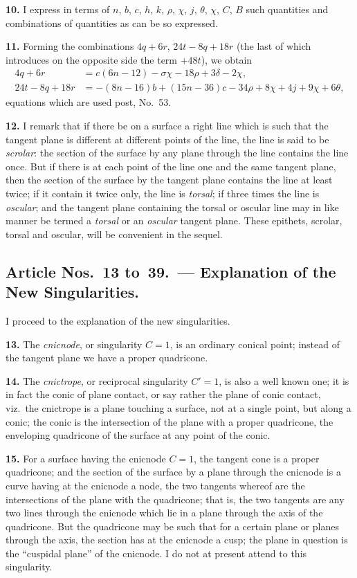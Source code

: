 \documentclass[11pt,a4paper]{article}
\begin{document}
\textbf{10.} I express in terms of $n$, $b$, $c$, $h$, $k$, $\rho$, $\chi$, $j$, $\theta$, $\chi$, $C$, $B$ such quantities and combinations of quantities as can be so expressed.

\textbf{11.} Forming the combinations $4q+6r$, $24t-8q+18r$ (the last of which introduces on the opposite side the term $+48t$), we obtain
\begin{align*}
4q + 6r &= c(6n-12) - \sigma\chi - 18\rho + 3\delta - 2\chi, \\
24t - 8q + 18r &= -(8n-16)b + (15n-36)c - 34\rho + 8\chi + 4j + 9\chi + 6\theta,
\end{align*}
equations which are used post, No.~53.

\textbf{12.} I remark that if there be on a surface a right line which is such that the tangent plane is different at different points of the line, the line is said to be \textit{scrolar}: the section of the surface by any plane through the line contains the line once. But if there is at each point of the line one and the same tangent plane, then the section of the surface by the tangent plane contains the line at least twice; if it contain it twice only, the line is \textit{torsal}; if three times the line is \textit{oscular}; and the tangent plane containing the torsal or oscular line may in like manner be termed a \textit{torsal} or an \textit{oscular} tangent plane. These epithets, scrolar, torsal and oscular, will be convenient in the sequel.

\subsection*{Article Nos.~13 to~39.\ --- Explanation of the New Singularities.}

I proceed to the explanation of the new singularities.

\textbf{13.} The \textit{cnicnode}, or singularity $C=1$, is an ordinary conical point; instead of the tangent plane we have a proper quadricone.

\textbf{14.} The \textit{cnictrope}, or reciprocal singularity $C'=1$, is also a well known one; it is in fact the conic of plane contact, or say rather the plane of conic contact, viz.\ the cnictrope is a plane touching a surface, not at a single point, but along a conic; the conic is the intersection of the plane with a proper quadricone, the enveloping quadricone of the surface at any point of the conic.

\textbf{15.} For a surface having the cnicnode $C=1$, the tangent cone is a proper quadricone; and the section of the surface by a plane through the cnicnode is a curve having at the cnicnode a node, the two tangents whereof are the intersections of the plane with the quadricone; that is, the two tangents are any two lines through the cnicnode which lie in a plane through the axis of the quadricone. But the quadricone may be such that for a certain plane or planes through the axis, the section has at the cnicnode a cusp; the plane in question is the ``cuspidal plane'' of the cnicnode. I do not at present attend to this singularity.
\end{document}
